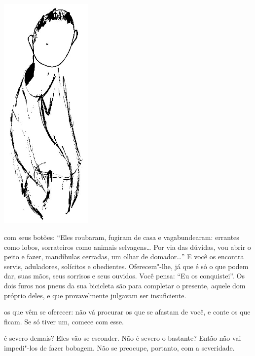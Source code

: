 \begin{vplace}[1]
\begin{center}
\includegraphics[width=45mm]{./imgs/Image_2.jpg}
\end{center}
\end{vplace}

\pagebreak
\thispagestyle{empty}

\movetooddpage

 com seus botões: ``Eles roubaram, fugiram de casa e vagabundearam:
errantes como lobos, sorrateiros como animais selvagens\ldots{} Por via das
dúvidas, vou abrir o peito e fazer, mandíbulas cerradas, um olhar de
domador\ldots{}'' E você os encontra servis, aduladores, solícitos e
obedientes. Oferecem"-lhe, já que é só o que podem dar, suas mãos, seus
sorrisos e seus ouvidos. Você pensa: ``Eu os conquistei''. Os dois furos
nos pneus da sua bicicleta são para completar o presente, aquele dom
próprio deles, e que provavelmente julgavam ser insuficiente.

\bigskip
\bigskip


 os que vêm se oferecer: não vá procurar os que se afastam de
você, e conte os que ficam. Se só tiver um, comece com esse.

\bigskip
\bigskip


 é severo demais? Eles vão se esconder. Não é severo o bastante?
Então não vai impedi"-los de fazer bobagem. Não se preocupe, portanto,
com a severidade.


